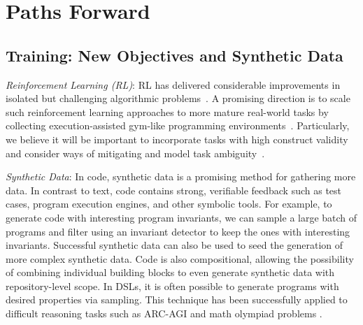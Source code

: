 \vspace{-0.3cm}

\section{Paths Forward} \label{sec:paths}


\vspace{-0.2cm}

\subsection{Training: New Objectives and Synthetic Data}

\vspace{-0.1cm}

\textit{Reinforcement Learning (RL)}: 
RL has delivered considerable improvements in isolated but challenging algorithmic  problems~\citep{deepseekai2025deepseekr1}.
A promising direction is to scale such reinforcement learning approaches to more mature real-world tasks by collecting execution-assisted gym-like programming environments~\citep{jain2024r2e, pan2024trainingsoftwareengineeringagents}.
Particularly, we believe it will be important to incorporate tasks with high construct validity and consider ways of mitigating and model task ambiguity~\citep{shao2024collaborativegym}.



\textit{Synthetic Data}: In code, synthetic data is a promising method for gathering more data. In contrast to text, code contains strong, verifiable feedback such as test cases, program execution engines, and other symbolic tools. For example, to generate code with interesting program invariants, we can sample a large batch of programs and filter using an invariant detector to keep the ones with interesting invariants. Successful synthetic data can also be used to seed the generation of more complex synthetic data. Code is also compositional, allowing the possibility of combining individual building blocks to even generate synthetic data with repository-level scope. In DSLs, it is often possible to generate programs with desired properties via sampling. This technique has been successfully applied to difficult reasoning tasks such as ARC-AGI \citep{li2024combining} and math olympiad problems \citep{trinh2024solving, deepmindalphaproof}.

